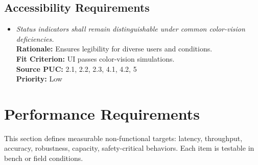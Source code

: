 \documentclass[12pt]{article}
\begin{document}
\subsection{Accessibility Requirements}
\begin{itemize}[leftmargin=*]
  \item[ACR-1] \emph{Status indicators shall remain distinguishable under common
          color-vision deficiencies.}\\[2mm]
        \textbf{Rationale:} Ensures legibility for diverse users and conditions.\\
        \textbf{Fit Criterion:} UI passes color-vision simulations.\\
        \textbf{Source PUC:} 2.1, 2.2, 2.3, 4.1, 4.2, 5 \\
        \textbf{Priority:} Low
\end{itemize}

\section{Performance Requirements}
\label{sec:performance}
This section defines measurable non-functional targets: latency, throughput,
accuracy, robustness, capacity, safety-critical behaviors. Each item is
testable in bench or field conditions.
\end{document}
